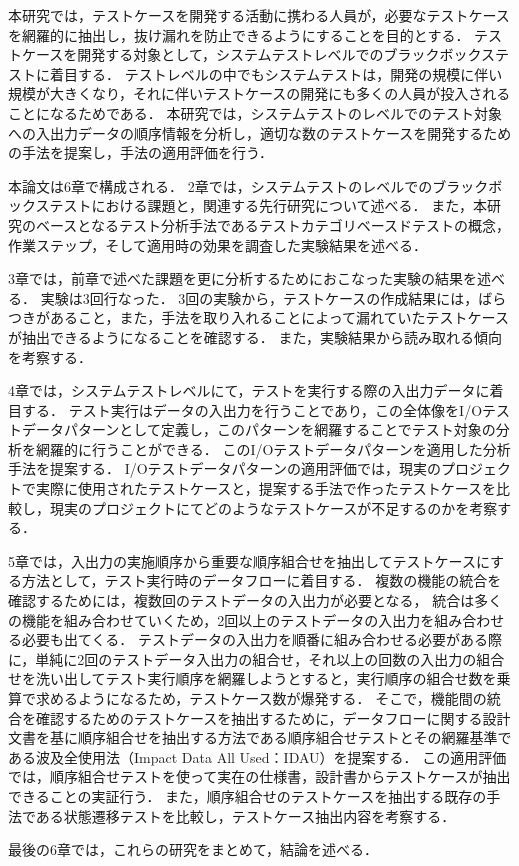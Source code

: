 本研究では，テストケースを開発する活動に携わる人員が，必要なテストケースを網羅的に抽出し，抜け漏れを防止できるようにすることを目的とする．
テストケースを開発する対象として，システムテストレベルでのブラックボックステストに着目する．
テストレベルの中でもシステムテストは，開発の規模に伴い規模が大きくなり，それに伴いテストケースの開発にも多くの人員が投入されることになるためである．
本研究では，システムテストのレベルでのテスト対象への入出力データの順序情報を分析し，適切な数のテストケースを開発するための手法を提案し，手法の適用評価を行う．

本論文は6章で構成される．
2章では，システムテストのレベルでのブラックボックステストにおける課題と，関連する先行研究について述べる．
また，本研究のベースとなるテスト分析手法であるテストカテゴリベースドテストの概念，作業ステップ，そして適用時の効果を調査した実験結果を述べる．

3章では，前章で述べた課題を更に分析するためにおこなった実験の結果を述べる．
実験は3回行なった．
3回の実験から，テストケースの作成結果には，ばらつきがあること，また，手法を取り入れることによって漏れていたテストケースが抽出できるようになることを確認する．
また，実験結果から読み取れる傾向を考察する．

4章では，システムテストレベルにて，テストを実行する際の入出力データに着目する．
テスト実行はデータの入出力を行うことであり，この全体像をI/Oテストデータパターンとして定義し，このパターンを網羅することでテスト対象の分析を網羅的に行うことができる．
このI/Oテストデータパターンを適用した分析手法を提案する．
I/Oテストデータパターンの適用評価では，現実のプロジェクトで実際に使用されたテストケースと，提案する手法で作ったテストケースを比較し，現実のプロジェクトにてどのようなテストケースが不足するのかを考察する．

5章では，入出力の実施順序から重要な順序組合せを抽出してテストケースにする方法として，テスト実行時のデータフローに着目する．
複数の機能の統合を確認するためには，複数回のテストデータの入出力が必要となる，
統合は多くの機能を組み合わせていくため，2回以上のテストデータの入出力を組み合わせる必要も出てくる．
テストデータの入出力を順番に組み合わせる必要がある際に，単純に2回のテストデータ入出力の組合せ，それ以上の回数の入出力の組合せを洗い出してテスト実行順序を網羅しようとすると，実行順序の組合せ数を乗算で求めるようになるため，テストケース数が爆発する．
そこで，機能間の統合を確認するためのテストケースを抽出するために，データフローに関する設計文書を基に順序組合せを抽出する方法である順序組合せテストとその網羅基準である波及全使用法（Impact Data All Used：IDAU）を提案する．
この適用評価では，順序組合せテストを使って実在の仕様書，設計書からテストケースが抽出できることの実証行う．
また，順序組合せのテストケースを抽出する既存の手法である状態遷移テストを比較し，テストケース抽出内容を考察する．

最後の6章では，これらの研究をまとめて，結論を述べる．
